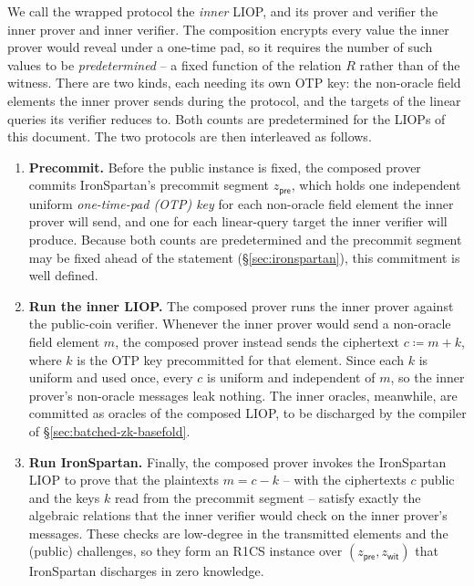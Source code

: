 \documentclass{article}
\theoremstyle{definition}
\begin{document}
We call the wrapped protocol the \emph{inner} LIOP, and its prover and verifier the inner prover and inner verifier. The composition encrypts every value the inner prover would reveal under a one-time pad, so it requires the number of such values to be \emph{predetermined} -- a fixed function of the relation $R$ rather than of the witness. There are two kinds, each needing its own OTP key: the non-oracle field elements the inner prover sends during the protocol, and the targets of the linear queries its verifier reduces to. Both counts are predetermined for the LIOPs of this document. The two protocols are then interleaved as follows.

\begin{enumerate}
\item \textbf{Precommit.} Before the public instance is fixed, the composed prover commits IronSpartan's precommit segment $z_{\textsf{pre}}$, which holds one independent uniform \emph{one-time-pad (OTP) key} for each non-oracle field element the inner prover will send, and one for each linear-query target the inner verifier will produce. Because both counts are predetermined and the precommit segment may be fixed ahead of the statement (\S\ref{sec:ironspartan}), this commitment is well defined.

\item \textbf{Run the inner LIOP.} The composed prover runs the inner prover against the public-coin verifier. Whenever the inner prover would send a non-oracle field element $m$, the composed prover instead sends the ciphertext $c \coloneqq m + k$, where $k$ is the OTP key precommitted for that element. Since each $k$ is uniform and used once, every $c$ is uniform and independent of $m$, so the inner prover's non-oracle messages leak nothing. The inner oracles, meanwhile, are committed as oracles of the composed LIOP, to be discharged by the compiler of \S\ref{sec:batched-zk-basefold}.

\item \textbf{Run IronSpartan.} Finally, the composed prover invokes the IronSpartan LIOP to prove that the plaintexts $m = c - k$ -- with the ciphertexts $c$ public and the keys $k$ read from the precommit segment -- satisfy exactly the algebraic relations that the inner verifier would check on the inner prover's messages. These checks are low-degree in the transmitted elements and the (public) challenges, so they form an R1CS instance over $(z_{\textsf{pre}}, z_{\textsf{wit}})$ that IronSpartan discharges in zero knowledge.
\end{enumerate}
\end{document}
